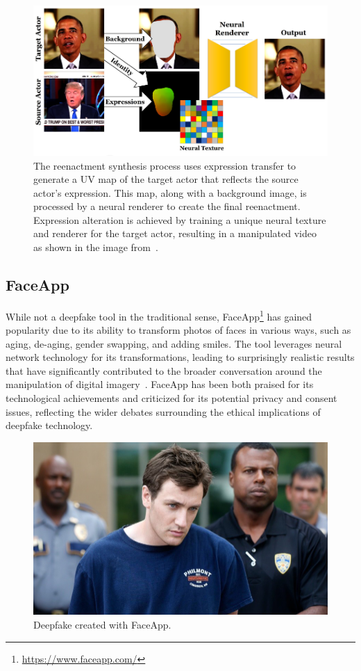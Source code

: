 \begin{figure}[htpb]
	\centering
	\includegraphics[width=0.7\columnwidth]{figures/neural_textures}
	\caption{The reenactment synthesis process uses expression transfer
		to generate a UV map of the target actor that reflects the source
		actor's expression. This map, along with a background image, is
		processed by a neural renderer to create the final reenactment.
		Expression alteration is achieved by training a unique neural
		texture and renderer for the target actor, resulting in a
		manipulated video as shown in the image from~\cite{thies2019deferred}.}\label{fig:neural_textures}
\end{figure}


\subsection{FaceApp}\label{sec:faceapp}
While not a deepfake tool in the traditional sense,
FaceApp\footnote{\url{https://www.faceapp.com/}} has gained popularity due
to its ability to transform photos of faces in various ways, such as aging,
de-aging, gender swapping, and adding smiles. The tool leverages neural
network technology for its transformations, leading to surprisingly
realistic results that have significantly contributed to the broader conversation
around the manipulation of digital imagery~\cite{faceapp}. FaceApp has
been both praised for its technological achievements and criticized for
its potential privacy and consent issues, reflecting the wider debates
surrounding the ethical implications of deepfake technology.

\begin{figure}[htpb]
	\centering
	\includegraphics[width=0.61\columnwidth]{figures/faceapp}
	\caption{Deepfake created with FaceApp.} %
\end{figure}


